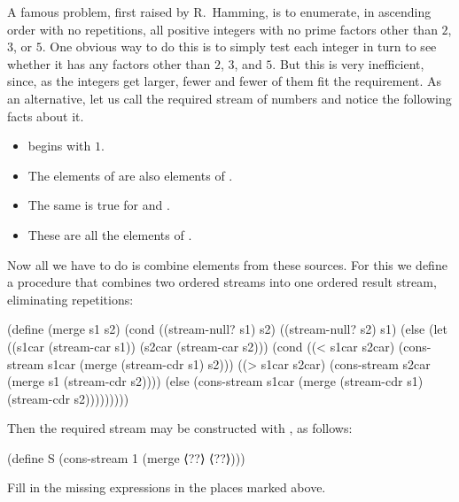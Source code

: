 \begin{exercise}
	\label{Exercise 3.56}
	A famous problem, first raised by R.~Hamming, is to enumerate, in ascending order with no repetitions, all positive integers with no prime factors other than \( 2 \), \( 3 \), or \( 5 \).
	One obvious way to do this is to simply test each integer in turn to see whether it has any factors other than \( 2 \), \( 3 \), and \( 5 \).
	But this is very inefficient, since, as the integers get larger, fewer and fewer of them fit the requirement.
	As an alternative, let us call the required stream of numbers  and notice the following facts about it.
	\begin{itemize}

		\item
			 begins with \( 1 \).

		\item
			The elements of  are also elements of .

		\item
			The same is true for  and .

		\item
			These are all the elements of .

	\end{itemize}
	Now all we have to do is combine elements from these sources.
	For this we define a procedure  that combines two ordered streams into one ordered result stream, eliminating repetitions:
	\begin{scheme}
	  (define (merge s1 s2)
	    (cond ((stream-null? s1) s2)
	          ((stream-null? s2) s1)
	          (else
	           (let ((s1car (stream-car s1))
	                 (s2car (stream-car s2)))
	             (cond ((< s1car s2car)
	                    (cons-stream
	                     s1car
	                     (merge (stream-cdr s1) s2)))
	                   ((> s1car s2car)
	                    (cons-stream
	                     s2car
	                     (merge s1 (stream-cdr s2))))
	                   (else
	                    (cons-stream
	                     s1car
	                     (merge (stream-cdr s1)
	                            (stream-cdr s2)))))))))
	\end{scheme}
	Then the required stream may be constructed with , as follows:
	\begin{scheme}
	  (define S (cons-stream 1 (merge ⟨??⟩ ⟨??⟩)))
	\end{scheme}
	Fill in the missing expressions in the places marked  above.
\end{exercise}



